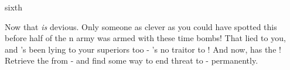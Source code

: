 \documentclass[greennotebook]{NeptuneBall}
\begin{document}
\begin{page}{sixth}

Now that \emph{is} devious. Only someone as clever as you could have spotted this before half of the \pPacifica{}n army was armed with these time bombs! That \cGeneral{} lied to you, and \cGeneral{\they}'s been lying to your superiors too - \cGeneral{\they}'s no traitor to \pAtlantis{}! And now, \cGeneral{\they} has the \iBattlePlan{\MYname}! Retrieve the \iBattlePlan{} from \cGeneral{\them} - and find some way to end \cGeneral{\their} threat to \pPacifica{} - permanently.

\end{page}

\endnotebook
\end{document}
